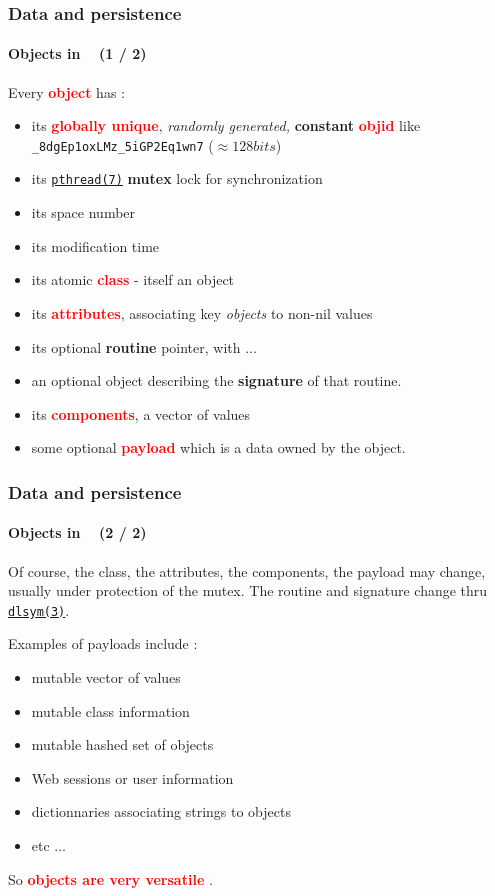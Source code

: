 \documentclass[xcolor=svgnames,final,smaller,a4]{beamer}
\begin{document}
\begin{frame}
    \frametitle{Data and persistence}
    \framesubtitle{Objects in \Bismon ~ (1 / 2)}

    Every \textcolor{red}{\textbf{object}} has : 
    \begin{itemize}
    \item its \textcolor{red}{\textbf{globally unique}}, \textit{randomly generated,}  \textbf{constant} \textcolor{red}{\textbf{objid}} like \texttt{\_8dgEp1oxLMz\_5iGP2Eq1wn7} ($\approx 128 bits$)
    \item its {\href{http://man7.org/linux/man-pages/man7/pthreads.7.html}{\texttt{pthread(7)}}} \textbf{mutex} lock for synchronization
    \item its space number
    \item its modification time
    \item its atomic {\textcolor{red}{\textbf{class}}} - itself an object
    \item its {\textcolor{red}{\textbf{attributes}}}, associating key \textit{objects} to non-nil values
    \item its optional \textbf{routine} pointer, with ...
    \item an optional object describing the \textbf{signature} of that routine.
  \item its {\textcolor{red}{\textbf{components}}}, a vector of values
  \item some optional {\textcolor{red}{\textbf{payload}}} which is a data owned by the object. 
    \end{itemize}

\end{frame}


\begin{frame}
    \frametitle{Data and persistence}
    \framesubtitle{Objects in \Bismon ~ (2 / 2)}
    
Of course, the class, the attributes, the components, the payload may
change, usually under protection of the mutex.  The routine and
signature change thru
{\href{http://man7.org/linux/man-pages/man3/dlsym.3.html}{\texttt{dlsym(3)}}}.

Examples of payloads include :
\begin{itemize}
\item mutable vector of values
\item mutable class information {}
\item mutable hashed set of objects
\item Web sessions or user information
\item dictionnaries associating strings to objects
\item etc ...
\end{itemize}

So {\Bismon} {\textcolor{red}{\textbf{objects are very versatile}}} {}.
\end{frame}
\end{document}

